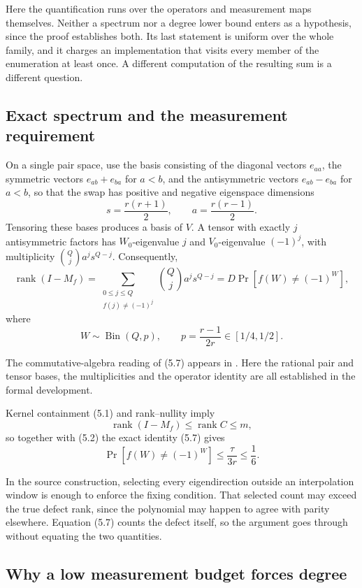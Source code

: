 \documentclass[11pt,letterpaper]{article}
\begin{document}
Here the quantification runs over the operators and measurement maps
themselves. Neither a spectrum nor a degree lower bound enters as a
hypothesis, since the proof establishes both. Its last statement is
uniform over the whole family, and it charges an implementation that
visits every member of the enumeration at least once. A different
computation of the resulting sum is a different question.

\subsection{Exact spectrum and the measurement
requirement}\label{exact-spectrum-and-the-measurement-requirement}

On a single pair space, use the basis consisting of the diagonal vectors
\(e_{aa}\), the symmetric vectors \(e_{ab}+e_{ba}\) for \(a<b\), and the
antisymmetric vectors \(e_{ab}-e_{ba}\) for \(a<b\), so that the swap
has positive and negative eigenspace dimensions
\[s=\frac{r(r+1)}2,\qquad a=\frac{r(r-1)}2.\] Tensoring these bases
produces a basis of \(V\). A tensor with exactly \(j\) antisymmetric
factors has \(W_0\)-eigenvalue \(j\) and \(V_0\)-eigenvalue \((-1)^j\),
with multiplicity \(\binom Qj a^j s^{Q-j}\). Consequently,
\[\operatorname{rank}(I-M_f)
 =\sum_{\substack{0\le j\le Q\\ f(j)\ne(-1)^j}}
   \binom Qj a^j s^{Q-j}
 =D\Pr[f(W)\ne(-1)^W],                     \tag{5.7}\] where
\[W\sim\operatorname{Bin}(Q,p),
\qquad p=\frac{r-1}{2r}\in[1/4,1/2].\]

The commutative-algebra reading of (5.7) appears in \citep[Section
1.2]{T26note}. Here the rational pair and tensor bases, the
multiplicities and the operator identity are all established in the
formal development.

Kernel containment (5.1) and rank--nullity imply
\[\operatorname{rank}(I-M_f)\le\operatorname{rank}C\le m,\] so together
with (5.2) the exact identity (5.7) gives
\[\Pr[f(W)\ne(-1)^W]\le\frac\tau{3r}\le\frac16.  \tag{5.8}\]

In the source construction, selecting every eigendirection outside an
interpolation window is enough to enforce the fixing condition. That
selected count may exceed the true defect rank, since the polynomial may
happen to agree with parity elsewhere. Equation (5.7) counts the defect
itself, so the argument goes through without equating the two
quantities.

\subsection{Why a low measurement budget forces
degree}\label{why-a-low-measurement-budget-forces-degree}
\end{document}
